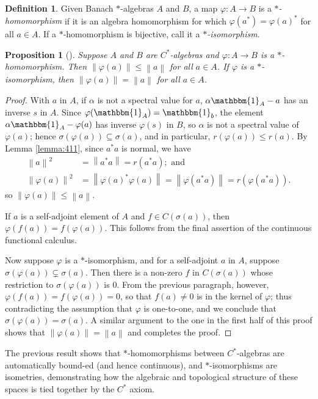 \documentclass[11pt,a4paper]{report}
\theoremstyle{plain}
\newtheorem{prop}{Proposition}
\theoremstyle{definition}
\newtheorem{defn}{Definition}
\newcommand{\1}{\mathbbm{1}}
\renewcommand{\phi}{\varphi}
\newcommand{\spec}[1]{\sigma(#1)}
\begin{document}
\begin{defn}
	Given Banach $\ast$-algebras $A$ and $B$, a map $\phi:A\to B$ is a 
	\emph{$\ast$-homomorphism} if it is an algebra homomorphism for which 
	$\phi(a^\ast) = \phi(a)^\ast$ for all $a \in A$. If a $\ast$-homomorphism is 
	bijective, call it a \emph{$\ast$-isomorphism}.
\end{defn}
\begin{prop}[{\cite[4.1.8]{kadison83}}] \label{prop:homo}
	Suppose $A$ and $B$ are $C^\ast$-algebras and $\phi:A\to B$ is a 
	$\ast$-homomorphism. Then $\left\|\phi(a)\right\| \leq \left\|a\right\|$ for all 
	$a \in A$. If $\phi$ is a $\ast$-isomorphism, then $\left\|\phi(a)\right\| = 
	\left\|a\right\|$ for all $a \in A$.


\end{prop}
\begin{proof}
	With $a$ in $A$, if $\alpha$ is not a spectral value for $a$, $\alpha\1_A-a$ has 
	an inverse $s$ in $A$. Since $\phi(\1_A) =\1_b$, the element $\alpha \1_A-\phi(a)$ 
	has inverse $\phi(s)$ in $B$, so $\alpha$ is not a spectral value of $\phi(a)$; 
	hence $\spec {\phi(a)}\subseteq \spec a$, and in particular, $r(\phi(a))\leq 
	r(a)$. By Lemma \ref{lemma:411}, since $a^\ast a$ is normal, we have 
	\begin{align*}
		\left\|a\right\|^2			
					&=	\left\|a^\ast a\right\|   = 	r(a^\ast a);  \mbox{ and }			\\
		\left\|\phi(a)\right\|^2 &=\left\|\phi(a)^\ast\phi(a)\right\| = 
							 \left\|\phi(a^\ast a)\right\| = r(\phi(a^\ast a)).
	\end{align*}
	so $\left\|\phi(a)\right\|\leq \left\|a\right\|$.
	
	If $a$ is a self-adjoint element of $A$ and $f \in C(\spec a)$, then 
	$\phi(f(a))=f(\phi(a))$. This follows from the final assertion of the continuous 
	functional calculus.

	
	Now suppose $\phi$ is a $\ast$-isomorphism, and for a self-adjoint $a$ in $A$, 
	suppose $\spec{\phi(a)} \subsetneq \spec a$. Then there is a non-zero $f$ in 
	$C(\spec a)$ whose restriction to $\spec{\phi(a)}$ is 0. From the previous 
	paragraph, however, $\phi(f(a)) = f(\phi(a))=0$, so that $f(a)\not= 0$ is in the 
	kernel of $\phi$; thus contradicting the assumption that $\phi$ is one-to-one, 
	and we conclude that $\spec{\phi(a)} = \spec a$. A similar argument to the one 
	in the first half of this proof shows that $\left\|\phi(a)\right\| = 
	\left\|a\right\|$ and completes the proof.


\end{proof}
The previous result shows that $\ast$-homomorphisms between $C^\ast$-algebras are 
automatically bound-ed (and hence continuous), and $\ast$-isomorphisms are 
isometries, demonstrating how the algebraic and topological structure of these 
spaces is tied together by the $C^\ast$ axiom.
\end{document}
